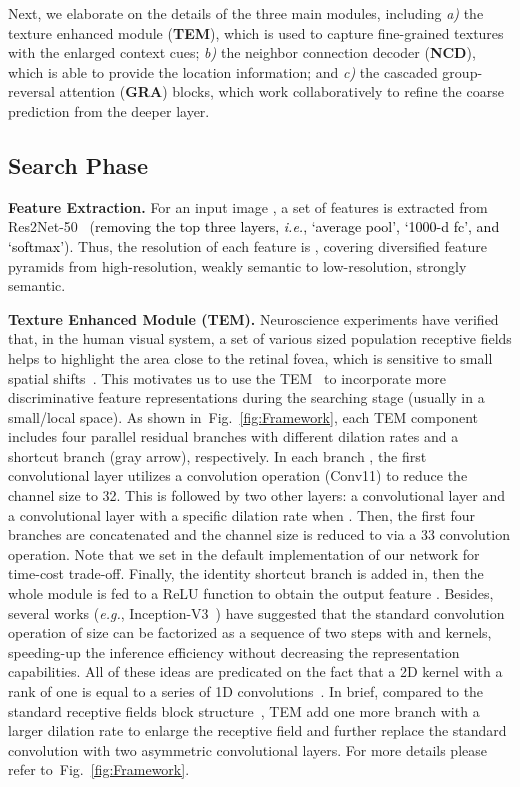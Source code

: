 \documentclass[10pt,journal,compsoc]{IEEEtran}
\def\ie{\emph{i.e.}}
\def\eg{\emph{e.g.}}
\newcommand{\myPara}[1]{\vspace{6pt}\noindent\textbf{#1}\qquad }
\newcommand{\figref}[1]{Fig.~\ref{#1}}
\newcommand{\Rev}[1]{\textcolor{black}{#1}}
\begin{document}
Next, we elaborate on the details of the three main modules, including 
\textit{a)} the texture enhanced module (\textbf{TEM}), 
which is used to capture fine-grained textures with the enlarged context cues; 
\textit{b)} the neighbor connection decoder (\textbf{NCD}), 
which is able to provide the location information; and 
\textit{c)} the cascaded group-reversal attention (\textbf{GRA}) blocks, 
which work collaboratively to refine the coarse prediction from 
the deeper layer.



\subsection{Search Phase}\label{sec:search_phase}

\myPara{Feature Extraction.}
For an input image , 
a set of features  is extracted from 
Res2Net-50~\cite{gao2019res2net} (\Rev{removing the top three layers, \ie, `average pool', `1000-d fc', and `softmax'}).
Thus, the resolution of each feature 
 is , 
covering diversified feature pyramids from high-resolution, 
weakly semantic to low-resolution, strongly semantic.


\myPara{Texture Enhanced Module (TEM).}
Neuroscience experiments have verified that, in the human visual system, 
a set of various sized population receptive fields helps to 
highlight the area close to the retinal fovea, 
which is sensitive to small spatial shifts~\cite{liu2018receptive}.
This motivates us to use the TEM~\cite{wu2019cascaded} to incorporate 
more discriminative feature representations during the searching stage 
(usually in a small/local space).
As shown in~\figref{fig:Framework}, each TEM component includes four parallel 
residual branches  with different dilation rates 
 and a shortcut branch (gray arrow), respectively.
In each branch , the first convolutional layer utilizes a  
convolution operation (Conv11) to reduce the channel size to 32.
This is followed by two other layers: 
a  convolutional layer and a  
convolutional layer with a specific dilation rate  when .
Then, the first four branches \Rev{} are concatenated and 
the channel size is reduced to  via a 33 convolution operation.
Note that we set  in the default implementation of our network 
for time-cost trade-off.
Finally, the identity shortcut branch is added in, then the whole module 
is fed to a ReLU function to obtain the output feature .
Besides, several works (\eg, Inception-V3~\cite{szegedy2016rethinking}) 
have suggested that the standard convolution operation of size 
 can be factorized as a sequence of two steps with 
 and  kernels, 
speeding-up the inference efficiency without decreasing the 
representation capabilities.
All of these ideas are predicated on the fact that a 2D kernel with a rank 
of one is equal to a series of 
1D convolutions~\cite{jaderberg2014speeding,denton2014exploiting}.
In brief, compared to the standard receptive fields block structure~\cite{liu2018receptive}, 
TEM add one more branch with a larger dilation rate to enlarge the 
receptive field and further replace the standard convolution 
with two asymmetric convolutional layers.
For more details please refer to~\figref{fig:Framework}.
\end{document}
